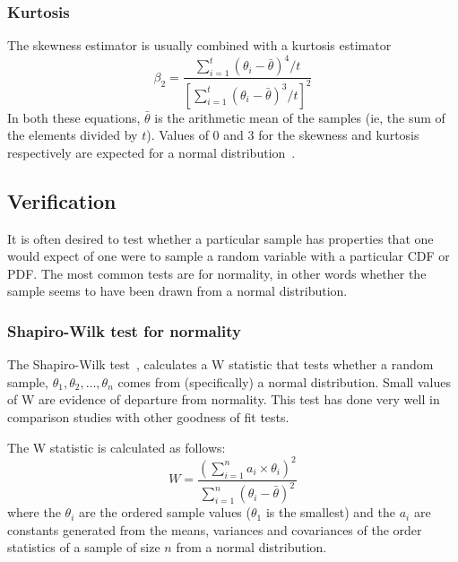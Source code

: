 \subsubsection{Kurtosis}
The skewness estimator is usually combined with a kurtosis estimator 
\begin{equation} 
  \beta_2 =
  \frac{\displaystyle\sum_{i=1}^t \left ( \theta_i - \bar{\theta} \right
    )^4/t} { \left [ \displaystyle\sum_{i=1}^t \left(
        \theta_i-\bar{\theta} \right)^3/t \right]^2} 
\end{equation}
%
In both these equations, $\bar{\theta}$ is the arithmetic mean of the
samples (ie, the sum of the elements divided by $t$).  Values of 0 and
3 for the skewness and kurtosis respectively are expected for a normal
distribution~\citep{kleijnen1975statistical}.

\subsection{Verification}
It is often desired to test whether a particular sample has properties that one would expect of one were to sample a random variable with a particular CDF or PDF.
The most common tests are for normality, in other words whether the sample seems to have been drawn from a normal distribution.

\subsubsection{Shapiro-Wilk test for normality}\label{sec:shapiro-wilk-test}
The Shapiro-Wilk test~\citep{shapirowilk}, calculates a W statistic
that tests whether a random sample, $\theta_1, \theta_2, \dots,
\theta_n$ comes from (specifically) a normal distribution.  Small
values of W are evidence of departure from normality.  This test has
done very well in comparison studies with other goodness of fit tests.

The W statistic is calculated as follows: 
\begin{equation} 
  \label{eq:shipirowilk} 
  W = \frac{
    \left( \displaystyle \sum_{i=1}^n {a_i \times \theta_i} \right)^2}
  {\displaystyle \sum_{i=1}^n 
    \left ( \theta_i - \bar{\theta} \right )^2}
\end{equation}
where the $\theta_i$ are the ordered sample values ($\theta_1$ is the
smallest) and the $a_i$ are constants generated from the means,
variances and covariances of the order statistics of a sample of size
$n$ from a normal distribution.

